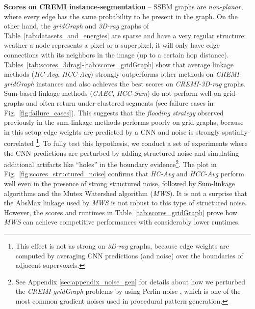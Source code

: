 \textbf{Scores on CREMI instance-segmentation} -- 
SSBM graphs are \emph{non-planar}, where every edge has the same probability to be present in the graph. On the other hand, the \emph{gridGraph} and \emph{3D-rag} graphs of Table~\ref{tab:datasets_and_energies} are sparse and have a very regular structure: weather a node represents a pixel or a superpixel, it will only have edge connections with its neighbors in the image (up to a certain hop distance). 
Tables~\ref{tab:scores_3drag}-\ref{tab:scores_gridGraph} show that average linkage methods (\emph{HC-Avg}, \emph{HCC-Avg}) strongly outperforms other methods on \emph{CREMI-gridGraph} instances and also achieves the best scores on \emph{CREMI-3D-rag} graphs. Sum-based linkage methods (\emph{GAEC}, \emph{HCC-Sum}) do not perform well on grid-graphs and often return under-clustered segments (see failure cases in Fig.~\ref{fig:failure_cases}). This suggests that the \emph{flooding strategy} observed previously in the sum-linkage methods performs poorly on grid-graphs, because in this setup edge weights are predicted by a CNN and noise is strongly spatially-correlated \footnote{This effect is not as strong on \emph{3D-rag} graphs, because edge weights are computed by averaging CNN predictions (and noise) over the boundaries of adjacent supervoxels.}.
To fully test this hypothesis, we conduct a set of experiments where the CNN predictions are perturbed by adding structured noise and simulating additional artifacts like ``holes'' in the boundary evidence\footnote{See Appendix \ref{sec:appendix_noise_gen} for details about how we perturbed the \emph{CREMI-gridGraph} problems by using Perlin noise \cite{perlin2001noise,perlin1985image}, which is one of the most common gradient noises used in procedural pattern generation.}. 
The plot in Fig.~\ref{fig:scores_structured_noise} confirms that \emph{HC-Avg} and \emph{HCC-Avg} perform well even in the presence of strong structured noise, followed by Sum-linkage algorithms and the Mutex Watershed algorithm (\emph{MWS}). It is not a surprise that the AbsMax linkage used by \emph{MWS} is not robust to this type of structured noise. However, the scores and runtimes in Table~\ref{tab:scores_gridGraph} prove how \emph{MWS} can achieve competitive performances with considerably lower runtimes. 

